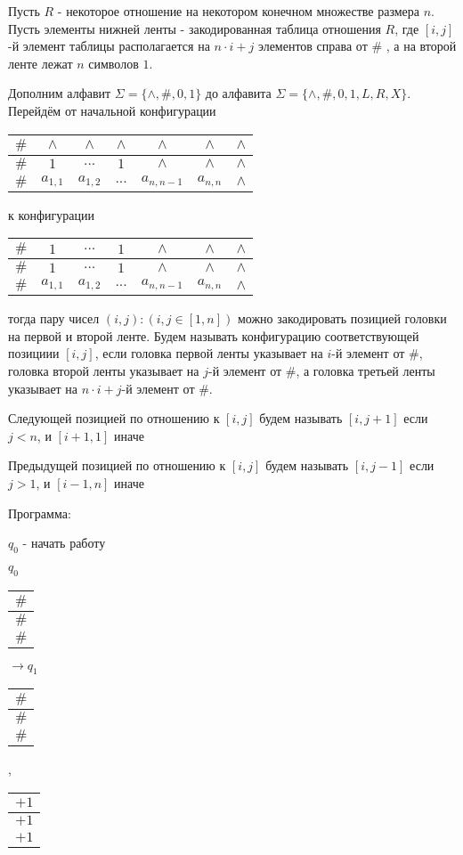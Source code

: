 \documentclass[12pt,a4paper]{article}
\newcommand{\tmsymbthree}[3]{\begin{tabular}{ | c | }
		\hline
		#1 \\ \hline
		#2 \\ \hline
		#3 \\ 
		\hline
	\end{tabular}}
\begin{document}
	
	Пусть $R$ - некоторое отношение на некотором конечном множестве размера $n$. Пусть элементы нижней ленты - закодированная таблица отношения $R$, где $[i,j]$-й элемент таблицы располагается на $n\cdot i + j$ элементов справа от $\#$ , а на второй ленте лежат $n$ символов $1$.
	
		Дополним алфавит $\Sigma = \{\wedge, \#, 0, 1\}$ до алфавита $\Sigma = \{\wedge, \#, 0, 1, L, R, X\}$. Перейдём от начальной конфигурации
	
	\begin{tabular}{ | c | c | c | c | c | c | c| }
			\hline
			$\#$ & $\wedge$ & $\wedge$ & $\wedge$ & $\wedge$ & $\wedge$ & $\wedge$  \\ \hline
			$\#$ & $1$ & $...$ & $1$ & $\wedge$ & $\wedge$ & $\wedge$ \\ \hline
			$\#$ & $a_{1,1}$ & $a_{1,2}$ & $...$ & $a_{n,n-1}$ & $a_{n,n}$ & $\wedge$ \\ 
			\hline
		\end{tabular}
		
	к конфигурации
	
	\begin{tabular}{ | c | c | c | c | c | c | c| }
		\hline
		$\#$ & $1$ & $...$ & $1$ & $\wedge$ & $\wedge$ & $\wedge$  \\ \hline
		$\#$ & $1$ & $...$ & $1$ & $\wedge$ & $\wedge$ & $\wedge$ \\ \hline
		$\#$ & $a_{1,1}$ & $a_{1,2}$ & $...$ & $a_{n,n-1}$ & $a_{n,n}$ & $\wedge$ \\ 
		\hline
	\end{tabular}
	
	тогда пару чисел $(i,j): (i,j \in [1,n])$ можно закодировать позицией головки на первой и второй ленте. Будем называть конфигурацию соответствующей позициии $[i,j]$, если головка первой ленты указывает на $i$-й элемент от $\#$,  головка второй ленты указывает на $j$-й элемент от $\#$, а головка третьей ленты указывает на $n\cdot i + j$-й элемент от $\#$. 
	
	Следующей позицией по отношению к $[i,j]$ будем называть $[i,j+1]$ если $j<n$, и $[i+1,1]$ иначе
	
	Предыдущей позицией по отношению к $[i,j]$ будем называть $[i,j-1]$ если $j>1$, и $[i-1,n]$ иначе
	
	Программа:
	
	$q_0$ - начать работу
	
	$q_0$ \tmsymbthree{$\#$}{$\#$}{$\#$} $ \to q_1$ \tmsymbthree{$\#$}{$\#$}{$\#$}, \tmsymbthree{$+1$}{$+1$}{$+1$}
	
\end{document}
